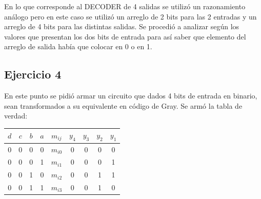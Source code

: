 \documentclass[a4paper]{article}
\begin{document}
En lo que corresponde al DECODER de 4 salidas se utilizó un razonamiento análogo pero en este caso se utilizó un arreglo de 2 bits para las 2 entradas y un arreglo de 4 bits para las distintas salidas. Se procedió a analizar según los valores que presentan los dos bits de entrada para así saber que elemento del arreglo de salida había que colocar en 0 o en 1.

\subsection*{Ejercicio 4}
En este punto se pidió armar un circuito que dados 4 bits de entrada en binario, sean transformados a su equivalente en código de Gray. Se armó la tabla de verdad: 
\begin{table}[H]
\centering
\begin{tabular}{|c|c|c|c|c|c|c|c|c|}
\hline
\multicolumn{1}{|c|}{\textbf{$d$}} & \multicolumn{1}{c|}{\textbf{$c$}} & \multicolumn{1}{c|}{\textbf{$b$}} & \textbf{$a$} & \textbf{$m_{ij}$} & \multicolumn{1}{c|}{\textbf{$y_4$}} & \multicolumn{1}{c|}{\textbf{$y_3$}} & \multicolumn{1}{c|}{\textbf{$y_2$}} & \multicolumn{1}{c|}{\textbf{$y_1$}} \\ \hline
0                                  & 0                                 & 0                                 & 0            & \textbf{$m_{i0}$} & 0                                   & 0                                   & 0                                   & 0                                   \\ \cline{5-5}
0                                  & 0                                 & 0                                 & 1            & \textbf{$m_{i1}$} & 0                                   & 0                                   & 0                                   & 1                                   \\ \cline{5-5}
0                                  & 0                                 & 1                                 & 0            & \textbf{$m_{i2}$} & 0                                   & 0                                   & 1                                   & 1                                   \\ \cline{5-5}
0                                  & 0                                 & 1                                 & 1            & \textbf{$m_{i3}$} & 0                                   & 0                                   & 1                                   & 0                                   \\ \cline{5-5}

\end{tabular}
\end{table}
\end{document}
